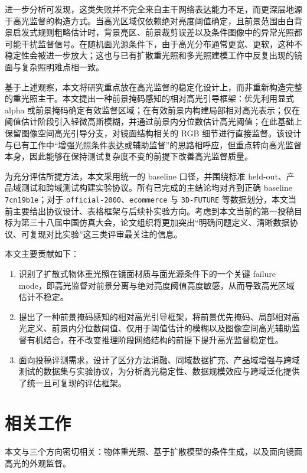 \documentclass[UTF8,a4paper]{ctexart}
\begin{document}
进一步分析可发现，这类失败并不完全来自主干网络表达能力不足，而更深层地源于高光监督的构造方式。当高光区域仅依赖绝对亮度阈值确定，且前景范围由白背景启发式规则粗略估计时，背景亮区、前景裁剪误差以及条件图像中的异常光照都可能干扰监督信号。在随机面光源条件下，由于高光分布通常更宽、更软，这种不稳定性会被进一步放大；这也与已有扩散重光照和多光照建模工作中反复出现的镜面与复杂照明难点相一致\cite{ref_ng,ref_illuminerf,ref_lightrig}。

基于上述观察，本文将研究重点放在高光监督的稳定化设计上，而非重新构造完整的重光照主干。本文提出一种前景掩码感知的相对高光引导框架：优先利用显式 alpha 或前景掩码确定有效监督区域；在有效前景内构建局部相对高光表示；仅在阈值估计阶段引入轻微高斯模糊，并通过前景内分位数估计高光阈值；在此基础上保留图像空间高光引导分支，对镜面结构相关的 RGB 细节进行直接监督。该设计与已有工作中“增强光照条件表达或辅助监督”的思路相呼应\cite{ref_lightit,ref_spotlight}，但重点转向高光监督本身，因此能够在保持测试复杂度不变的前提下改善高光监督质量。

为充分评估所提方法，本文采用统一的 baseline 口径，并围绕标准 held-out、产品域测试和跨域测试构建实验协议。所有已完成的主结论均对齐到正确 baseline \texttt{7cn19b1e}；对于 \texttt{official-2000}、\texttt{ecommerce} 与 \texttt{3D-FUTURE} 等数据划分，本文当前主要给出协议设计、表格框架与后续补实验方向。考虑到本文当前的第一投稿目标为第三十八届中国仿真大会，论文组织将更加突出“明确问题定义、清晰数据协议、可复现对比实验”这三类评审最关注的信息。

本文主要贡献如下：

\begin{enumerate}
\item 识别了扩散式物体重光照在镜面材质与面光源条件下的一个关键 failure mode，即高光监督对前景分离与绝对亮度阈值高度敏感，从而导致高光区域估计不稳定。
\item 提出了一种前景掩码感知的相对高光引导框架，将前景优先掩码、局部相对高光定义、前景内分位数阈值、仅用于阈值估计的模糊以及图像空间高光辅助监督有机结合，在不改变推理阶段网络结构的前提下提升高光监督稳定性。
\item 面向投稿评测需求，设计了区分方法消融、同域数据扩充、产品域增强与跨域测试的数据集与实验协议，为分析高光稳定性、数据规模效应与跨域泛化提供了统一且可复现的评估框架。
\end{enumerate}

\section{相关工作}

本文与三个方向密切相关：物体重光照、基于扩散模型的条件生成，以及面向镜面高光的外观监督。
\end{document}
